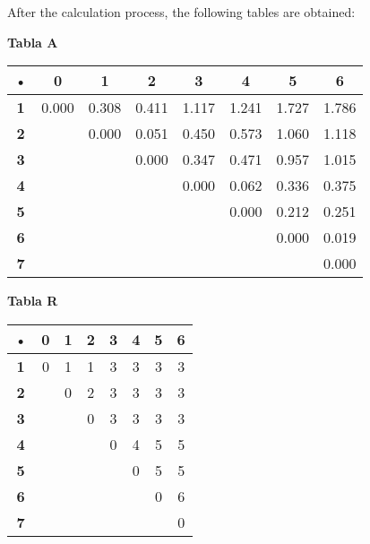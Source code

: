 \documentclass[a4paper,twocolumn,10pt]{article}
\begin{document}
 After the calculation process, the following tables are obtained: 
\begin{center} 
\textbf{Tabla A} \\ 
\begin{tabular}{|c|c|c|c|c|c|c|c|}
\hline \textbf{•} & \textbf{0}& \textbf{1}& \textbf{2}& \textbf{3}& \textbf{4}& \textbf{5}& \textbf{6}\\ \hline 
\textbf{1} & 0.000 & 0.308 & 0.411 & 1.117 & 1.241 & 1.727 & 1.786 \\ 
\hline 
\textbf{2} &  & 0.000 & 0.051 & 0.450 & 0.573 & 1.060 & 1.118 \\ 
\hline 
\textbf{3} &  &  & 0.000 & 0.347 & 0.471 & 0.957 & 1.015 \\ 
\hline 
\textbf{4} &  &  &  & 0.000 & 0.062 & 0.336 & 0.375 \\ 
\hline 
\textbf{5} &  &  &  &  & 0.000 & 0.212 & 0.251 \\ 
\hline 
\textbf{6} &  &  &  &  &  & 0.000 & 0.019 \\ 
\hline 
\textbf{7} &  &  &  &  &  &  & 0.000 \\ 
\hline 
\end{tabular} 
\end{center} 
\begin{center} 
\textbf{Tabla R} \\ 
\begin{tabular}{|c|c|c|c|c|c|c|c|}
\hline \textbf{•} & \textbf{0}& \textbf{1}& \textbf{2}& \textbf{3}& \textbf{4}& \textbf{5}& \textbf{6}\\ \hline 
\textbf{1} & 0 & 1 & 1 & 3 & 3 & 3 & 3 \\ 
\hline 
\textbf{2} &  & 0 & 2 & 3 & 3 & 3 & 3 \\ 
\hline 
\textbf{3} &  &  & 0 & 3 & 3 & 3 & 3 \\ 
\hline 
\textbf{4} &  &  &  & 0 & 4 & 5 & 5 \\ 
\hline 
\textbf{5} &  &  &  &  & 0 & 5 & 5 \\ 
\hline 
\textbf{6} &  &  &  &  &  & 0 & 6 \\ 
\hline 
\textbf{7} &  &  &  &  &  &  & 0 \\ 
\hline 
\end{tabular} 
\end{center} 
\end{document}
